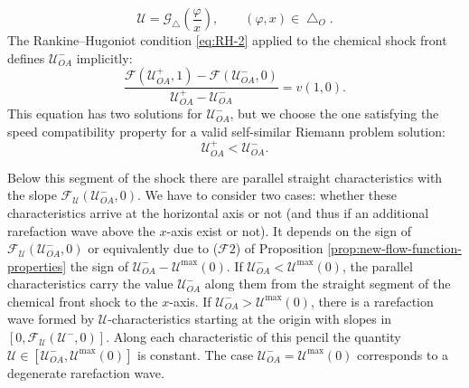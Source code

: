 \documentclass[12pt]{article}
\theoremstyle{definition}
\begin{document}
\begin{equation} \label{eq:U_val_pencile}
\mathcal U = \mathcal G_\bigtriangleup\left(\frac\varphi x\right),\qquad (\varphi, x)\in \bigtriangleup_O.
\end{equation}
The Rankine--Hugoniot condition \eqref{eq:RH-2} applied to the chemical shock front defines $\mathcal U_{OA}^-$ implicitly:
\[
\frac{\mathcal F(\mathcal U^+_{OA}, 1) - \mathcal F(\mathcal U^-_{OA}, 0)}{\mathcal U^+_{OA} - \mathcal U^-_{OA}} = v(1, 0).
\]
This equation has two solutions for $\mathcal U_{OA}^-$, but we choose the one satisfying the speed compatibility property for a valid self-similar Riemann problem solution:
\begin{equation}
\label{inq:U_Lax_cond}
    \mathcal U_{OA}^+ < \mathcal U_{OA}^-.
\end{equation}

Below this segment of the shock there are parallel straight characteristics with the slope $\mathcal F_{\mathcal U}(\mathcal U^-_{OA}, 0)$. 
We have to consider two cases: whether these characteristics arrive at the horizontal axis or not (and thus if an additional rarefaction wave above the $x$-axis exist or not). It depends on the sign of $\mathcal F_{\mathcal U}(\mathcal U^{-}_{OA},0)$ or equivalently due to  ($\mathcal F 2$) of Proposition \ref{prop:new-flow-function-properties} the sign of $\mathcal U^-_{OA} - \mathcal U^{\max}(0)$.
If $\mathcal U^-_{OA} < \mathcal U^{\max}(0)$,
the parallel characteristics carry the value $\mathcal U^-_{OA}$ along them from the straight segment of the chemical front shock to the $x$-axis.
If $\mathcal U^-_{OA} > \mathcal U^{\max}(0)$, there is a rarefaction wave formed by $\mathcal U$-characteristics starting at the origin with slopes in $[0, \mathcal F_{\mathcal U}(\mathcal U^-, 0)]$. Along each characteristic of this pencil the quantity $\mathcal U\in [\mathcal U^-_{OA}, \mathcal U^{\max}(0)]$ is constant. 
The case $\mathcal U^-_{OA} = \mathcal U^{\max}(0)$ corresponds to a degenerate rarefaction wave.
\end{document}
